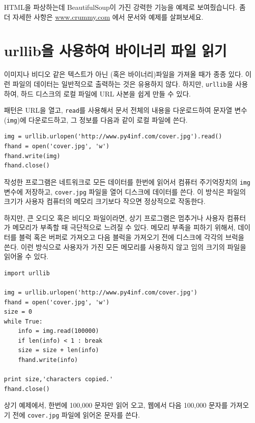 HTML을 파상하는데 BeautifulSoup이 가진 강력한 기능을 예제로 보여줬습니다.
좀더 자세한 사항은 \url{www.crummy.com} 에서 문서와 예제를 살펴보세요.

\section{urllib을 사용하여 바이너리 파일 읽기}

이미지나 비디오 같은 텍스트가 아닌 (혹은 바이너리)파일을 가져올 때가 종종 있다.
이런 파일의 데이터는 일반적으로 출력하는 것은 유용하지 않다. 하지만, {\tt urllib}을 사용하여,
하드 디스크의 로컬 파일에 URL 사본을 쉽게 만들 수 있다.


패턴은 URL을 열고, {\tt read}를 사용해서 문서 전체의 내용을 다운로드하여 문자열 변수({\tt img})에 다운로드하고,
그 정보를 다음과 같이 로컬 파일에 쓴다.

\beforeverb
\begin{verbatim}
img = urllib.urlopen('http://www.py4inf.com/cover.jpg').read()
fhand = open('cover.jpg', 'w')
fhand.write(img)
fhand.close()
\end{verbatim}
\afterverb
%

작성한 프로그램은 네트워크로 모든 데이터를 한번에 읽어서 컴퓨터 주기억장치의 {\tt img} 변수에 저장하고,
{\tt cover.jpg} 파일을 열어 디스크에 데이터를 쓴다. 이 방식은 파일의 크기가 사용자 컴퓨터의 메모리 크기보다 작으면 정상적으로 작동한다.

하지만, 큰 오디오 혹은 비디오 파일이라면, 상기 프로그램은 멈추거나 사용자 컴퓨터가 메모리가 부족할 때 극단적으로 느려질 수 있다.
메모리 부족을 피하기 위해서, 데이터를 블럭 혹은 버퍼로 가져오고 다음 블럭을 가져오기 전에 디스크에 각각의 브럭을 쓴다.
이런 방식으로 사용자가 가진 모든 메모리를 사용하지 않고 임의 크기의 파일을 읽어올 수 있다.

\beforeverb
\begin{verbatim}
import urllib

img = urllib.urlopen('http://www.py4inf.com/cover.jpg')
fhand = open('cover.jpg', 'w')
size = 0
while True:
    info = img.read(100000)
    if len(info) < 1 : break
    size = size + len(info)
    fhand.write(info)

print size,'characters copied.'
fhand.close()
\end{verbatim}
\afterverb
%

상기 예제에서, 한번에 100,000 문자만 읽어 오고, 웹에서 다음 100,000 문자를 가져오기 전에 {\tt cover.jpg} 파일에 읽어온 문자를 쓴다.

